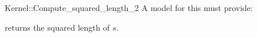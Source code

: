 \begin{ccRefFunctionObjectConcept}{Kernel::Compute_squared_length_2}
A model for this must provide:


       {returns the squared length of $s$. }

\ccIsModel{}

\end{ccRefFunctionObjectConcept}
